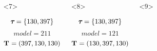 \begin{frame}[t]
\begin{columns}[c]
\begin{onlyenv}
\begin{minipage}[c][0.5\textheight][c]{\linewidth}
\begin{displaybox}[0.95\linewidth]
\begin{minipage}[c][0.45\textheight][c]{0.95\linewidth}
                    \end{minipage}
                \end{displaybox}
            \end{minipage}
        \end{onlyenv}
        \begin{onlyenv}<7>
            \begin{minipage}[c][0.5\textheight][c]{\linewidth}
                \begin{displaybox}[0.95\linewidth]
                    \begin{minipage}[c][0.45\textheight][c]{0.95\linewidth}
                        \[
                            \boldsymbol{\tau_{}} = \{130,397\}
                        \]\vspace{0mm}
                        \[
                            model = 211
                        \]\vspace{0mm}
                        \[
                            \mathbf{T_{}} = (397,130,130)
                        \]\vspace{0mm}
                    \end{minipage}
                \end{displaybox}
            \end{minipage}
        \end{onlyenv}
        \begin{onlyenv}<8>
            \begin{minipage}[c][0.5\textheight][c]{\linewidth}
                \begin{displaybox}[0.95\linewidth]
                    \begin{minipage}[c][0.45\textheight][c]{0.95\linewidth}
                        \[
                            \boldsymbol{\tau_{}} = \{130,397\}
                        \]\vspace{0mm}
                        \[
                            model = 121
                        \]\vspace{0mm}
                        \[
                            \mathbf{T_{}} = (130,397,130)
                        \]\vspace{0mm}
                    \end{minipage}
                \end{displaybox}
            \end{minipage}
        \end{onlyenv}
        \begin{onlyenv}<9>

\end{onlyenv}
\end{columns}
\end{frame}
